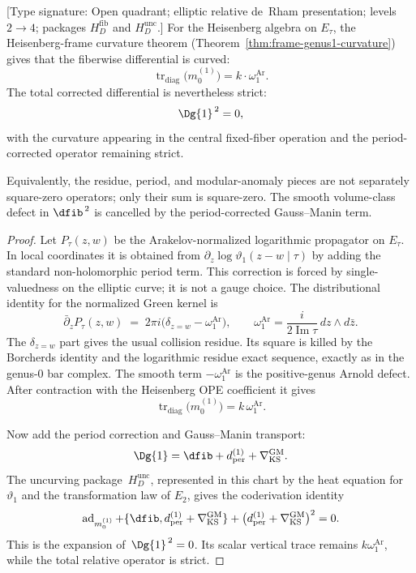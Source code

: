 \begin{theorem}
\label{thm:genus1-d-squared}
\textup{[Type signature: Open quadrant; elliptic relative de~Rham
presentation; levels $2\to4$; packages $H_D^{\mathrm{fib}}$ and
$H_D^{\mathrm{unc}}$.]}
For the Heisenberg algebra on $E_\tau$, the Heisenberg-frame curvature
theorem (Theorem~\ref{thm:frame-genus1-curvature}) gives that the
fiberwise differential is curved:
\[
\operatorname{tr}_{\mathrm{diag}}\!\bigl(m_0^{(1)}\bigr)
= k \cdot \omega_1^{\mathrm{Ar}}.
\]
The total corrected differential is nevertheless strict:
\[
\Dg{1}^{\,2} = 0,
\]
with the curvature appearing in the central fixed-fiber operation and
the period-corrected operator remaining strict.

Equivalently, the residue, period, and modular-anomaly pieces are not
separately square-zero operators; only their sum is square-zero. The
smooth volume-class defect in $\dfib^{\,2}$ is cancelled by the
period-corrected Gauss--Manin term.
\end{theorem}

\begin{proof}
Let $P_\tau(z,w)$ be the Arakelov-normalized logarithmic propagator
on $E_\tau$. In local coordinates it is obtained from
$\partial_z\log\vartheta_1(z-w\mid\tau)$ by adding the standard
non-holomorphic period term. This correction is forced by
single-valuedness on the elliptic curve; it is not a gauge choice.
The distributional identity for the normalized Green kernel is
\[
\bar\partial_z P_\tau(z,w)
\;=\;
2\pi i\bigl(\delta_{z=w}-\omega_1^{\mathrm{Ar}}\bigr),
\qquad
\omega_1^{\mathrm{Ar}}
=\frac{i}{2\operatorname{Im}\tau}\,dz\wedge d\bar z .
\]
The $\delta_{z=w}$ part gives the usual collision residue. Its square
is killed by the Borcherds identity and the logarithmic residue exact
sequence, exactly as in the genus-$0$ bar complex. The smooth term
$-\omega_1^{\mathrm{Ar}}$ is the positive-genus Arnold defect. After contraction
with the Heisenberg OPE coefficient it gives
\[
\operatorname{tr}_{\mathrm{diag}}\!\bigl(m_0^{(1)}\bigr)
=k\,\omega_1^{\mathrm{Ar}}.
\]

Now add the period correction and Gauss--Manin transport:
\[
\Dg{1}
=
\dfib+d_{\mathrm{per}}^{(1)}
+\nabla_{\mathrm{KS}}^{\mathrm{GM}}.
\]
The uncurving package~$H_D^{\mathrm{unc}}$, represented in this chart
by the heat equation for~$\vartheta_1$ and the transformation law of
$E_2$, gives the coderivation identity
\[
\operatorname{ad}_{m_0^{(1)}}
+
\{\dfib,d_{\mathrm{per}}^{(1)}
+\nabla_{\mathrm{KS}}^{\mathrm{GM}}\}
+
\bigl(d_{\mathrm{per}}^{(1)}
+\nabla_{\mathrm{KS}}^{\mathrm{GM}}\bigr)^2
=0.
\]
This is the expansion of~$\Dg{1}^{\,2}=0$.  Its scalar vertical trace
remains $k\omega_1^{\mathrm{Ar}}$, while the total relative operator
is strict.
\end{proof}

